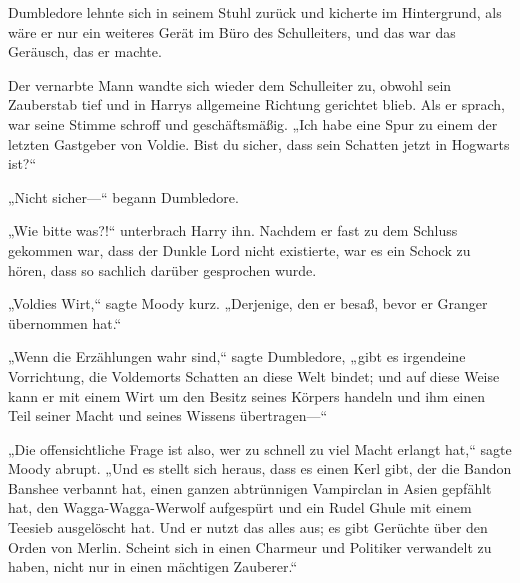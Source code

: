 Dumbledore lehnte sich in seinem Stuhl zurück und kicherte im Hintergrund, als wäre er nur ein weiteres Gerät im Büro des Schulleiters, und das war das Geräusch, das er machte.

Der vernarbte Mann wandte sich wieder dem Schulleiter zu, obwohl sein Zauberstab tief und in Harrys allgemeine Richtung gerichtet blieb. Als er sprach, war seine Stimme schroff und geschäftsmäßig.
„Ich habe eine Spur zu einem der letzten Gastgeber von Voldie. Bist du sicher, dass sein Schatten jetzt in Hogwarts ist?“

„Nicht sicher—“ begann Dumbledore.

„Wie bitte was?!“ unterbrach Harry ihn.
Nachdem er fast zu dem Schluss gekommen war, dass der Dunkle Lord nicht existierte, war es ein Schock zu hören, dass so sachlich darüber gesprochen wurde.

„Voldies Wirt,“ sagte Moody kurz. „Derjenige, den er besaß, bevor er Granger übernommen hat.“

„Wenn die Erzählungen wahr sind,“ sagte Dumbledore, „gibt es irgendeine Vorrichtung, die Voldemorts Schatten an diese Welt bindet; und auf diese Weise kann er mit einem Wirt um den Besitz seines Körpers handeln und ihm einen Teil seiner Macht und seines Wissens übertragen—“

„Die offensichtliche Frage ist also, wer zu schnell zu viel Macht erlangt hat,“ sagte Moody abrupt. „Und es stellt sich heraus, dass es einen Kerl gibt, der die Bandon Banshee verbannt hat, einen ganzen abtrünnigen Vampirclan in Asien gepfählt hat, den Wagga-Wagga-Werwolf aufgespürt und ein Rudel Ghule mit einem Teesieb ausgelöscht hat. Und er nutzt das alles aus; es gibt Gerüchte über den Orden von Merlin. Scheint sich in einen Charmeur und Politiker verwandelt zu haben, nicht nur in einen mächtigen Zauberer.“

